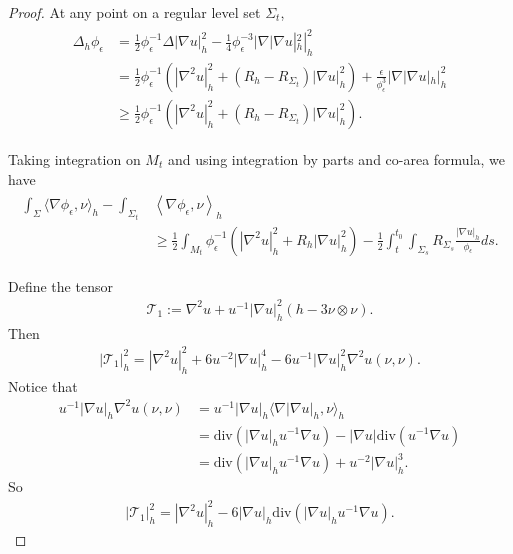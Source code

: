 \documentclass[letter]{amsart}
\theoremstyle{definition}
\theoremstyle{remark}
\begin{document}
\begin{proof}
At any point on a regular level set $\Sigma_t$,
\begin{align*}
	\begin{split}
		\Delta_h \phi _\epsilon &= \frac{1}{2} \phi _\epsilon ^{-1} \Delta |\nabla u|_h^2 - \frac{1}{4} \phi _\epsilon ^{-3} |\nabla |\nabla u|_h^2 |_h^2\\
				      &= \frac{1}{2} \phi _\epsilon ^{-1}\left( |\nabla ^2 u|_h^2 + (R_h - R_{\Sigma_t}) |\nabla u|_h^2 \right) + \frac{\epsilon }{\phi _\epsilon ^{3}} |\nabla |\nabla u|_h |_h^2 \\
				      &\geq \frac{1}{2} \phi _\epsilon ^{-1}\left( |\nabla ^2 u|_h^2 + (R_h - R_{\Sigma_t})|\nabla u|_h^2 \right) .
	\end{split}
\end{align*}

Taking integration on $M_t$ and using integration by parts and co-area formula, we have
\begin{align}\label{lap-ineq1}
	\begin{split}
		\int_{\Sigma } \langle \nabla \phi _\epsilon , \nu  \rangle_h-	\int_{\Sigma_t} &\left<\nabla \phi _\epsilon , \nu  \right>_h \\
	&\geq \frac{1}{2} \int_{M_t} \phi _\epsilon ^{-1}\left( |\nabla ^2 u|_h^2+ R_h|\nabla u|_h^2 \right) - \frac{1}{2} \int_{t}^{t_0} \int_{\Sigma_s} R_{\Sigma_s} \frac{|\nabla u|_h}{\phi _\epsilon } ds.
	\end{split}
\end{align}

Define the tensor 
\begin{align*}
	\mathcal{T}_1 := \nabla ^2 u + u ^{-1} |\nabla u|_h^2(h - 3 \nu \otimes \nu ).
\end{align*}
Then
\begin{align*}
	|\mathcal{T}_1|_h^2 = |\nabla ^2 u|^2_h + 6 u^{-2} |\nabla u|_h^{4} - 6 u ^{-1} |\nabla u|_h^2 \nabla ^2u (\nu ,\nu ).
\end{align*}
Notice that
\begin{align*}
	u^{-1} |\nabla u|_h \nabla ^2 u(\nu ,\nu ) &= u^{-1}|\nabla u|_h \langle \nabla |\nabla u|_h, \nu  \rangle_h\\
						   &= \mathrm{div}(|\nabla u|_h u^{-1} \nabla u) - |\nabla u| \mathrm{div}(u^{-1} \nabla u)\\
						   &= \mathrm{div} (|\nabla u|_h u^{-1}\nabla u) + u^{-2} |\nabla u|_h^{3}.
\end{align*}
So
\begin{align}\label{T-tensor1}
	|\mathcal{T}_1|_h^2 = |\nabla ^2 u|_h^2 - 6 |\nabla u|_h \mathrm{div} (|\nabla u|_h u^{-1}\nabla u).
\end{align}


\end{proof}
\end{document}
